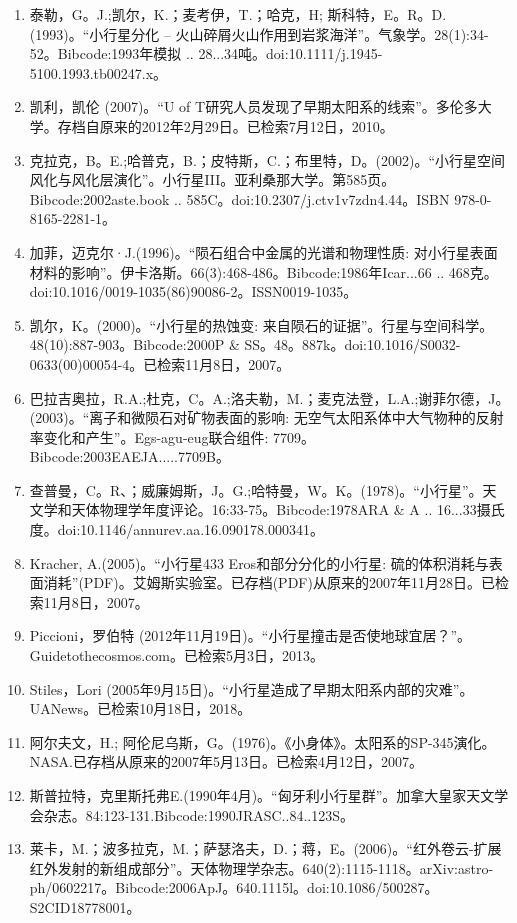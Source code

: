 \begin{enumerate}
\item 泰勒，G。J.;凯尔，K.；麦考伊，T.；哈克，H; 斯科特，E。R。D.(1993)。“小行星分化 -- 火山碎屑火山作用到岩浆海洋”。气象学。28(1):34-52。Bibcode:1993年模拟 .. 28...34吨。doi:10.1111/j.1945-5100.1993.tb00247.x。
\item 凯利，凯伦 (2007)。“U of T研究人员发现了早期太阳系的线索”。多伦多大学。存档自原来的2012年2月29日。已检索7月12日，2010。
\item 克拉克，B。E.;哈普克，B.；皮特斯，C.；布里特，D。(2002)。“小行星空间风化与风化层演化”。小行星III。亚利桑那大学。第585页。Bibcode:2002aste.book .. 585C。doi:10.2307/j.ctv1v7zdn4.44。ISBN 978-0-8165-2281-1。
\item 加菲，迈克尔·J.(1996)。“陨石组合中金属的光谱和物理性质: 对小行星表面材料的影响”。伊卡洛斯。66(3):468-486。Bibcode:1986年Icar...66 .. 468克。doi:10.1016/0019-1035(86)90086-2。ISSN0019-1035。 
\item 凯尔，K。(2000)。“小行星的热蚀变: 来自陨石的证据”。行星与空间科学。48(10):887-903。Bibcode:2000P & SS。48。887k。doi:10.1016/S0032-0633(00)00054-4。已检索11月8日，2007。
\item 巴拉吉奥拉，R.A.;杜克，C。A.;洛夫勒，M.；麦克法登，L.A.;谢菲尔德，J。(2003)。“离子和微陨石对矿物表面的影响: 无空气太阳系体中大气物种的反射率变化和产生”。Egs-agu-eug联合组件: 7709。Bibcode:2003EAEJA.....7709B。
\item 查普曼，C。R、；威廉姆斯，J。G.;哈特曼，W。K。(1978)。“小行星”。天文学和天体物理学年度评论。16:33-75。Bibcode:1978ARA & A .. 16...33摄氏度。doi:10.1146/annurev.aa.16.090178.000341。
\item Kracher, A.(2005)。“小行星433 Eros和部分分化的小行星: 硫的体积消耗与表面消耗”(PDF)。艾姆斯实验室。已存档(PDF)从原来的2007年11月28日。已检索11月8日，2007。
\item Piccioni，罗伯特 (2012年11月19日)。“小行星撞击是否使地球宜居？”。Guidetothecosmos.com。已检索5月3日，2013。
\item Stiles，Lori (2005年9月15日)。“小行星造成了早期太阳系内部的灾难”。UANews。已检索10月18日，2018。
\item 阿尔夫文，H.; 阿伦尼乌斯，G。(1976)。《小身体》。太阳系的SP-345演化。NASA.已存档从原来的2007年5月13日。已检索4月12日，2007。
\item 斯普拉特，克里斯托弗E.(1990年4月)。“匈牙利小行星群”。加拿大皇家天文学会杂志。84:123-131.Bibcode:1990JRASC..84..123S。
\item 莱卡，M.；波多拉克，M.；萨瑟洛夫，D.；蒋，E。(2006)。“红外卷云-扩展红外发射的新组成部分”。天体物理学杂志。640(2):1115-1118。arXiv:astro-ph/0602217。Bibcode:2006ApJ。640.1115l。doi:10.1086/500287。S2CID18778001。 

\end{enumerate}
